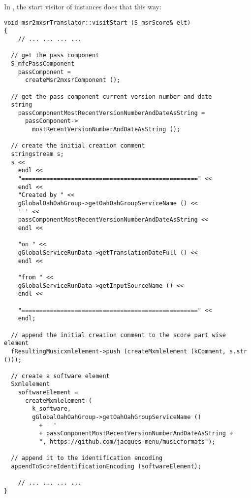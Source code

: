 In , the start visitor of  instances does that this way:
\begin{lstlisting}[language=CPlusPlus]
void msr2mxsrTranslator::visitStart (S_msrScore& elt)
{
 	// ... ... ... ...

  // get the pass component
  S_mfcPassComponent
    passComponent =
      createMsr2mxsrComponent ();

  // get the pass component current version number and date
  string
    passComponentMostRecentVersionNumberAndDateAsString =
      passComponent->
        mostRecentVersionNumberAndDateAsString ();

  // create the initial creation comment
  stringstream s;
  s <<
    endl <<
    "==================================================" <<
    endl <<
    "Created by " <<
    gGlobalOahOahGroup->getOahOahGroupServiceName () <<
    ' ' <<
    passComponentMostRecentVersionNumberAndDateAsString <<
    endl <<

    "on " <<
    gGlobalServiceRunData->getTranslationDateFull () <<
    endl <<

    "from " <<
    gGlobalServiceRunData->getInputSourceName () <<
    endl <<

    "==================================================" <<
    endl;

  // append the initial creation comment to the score part wise element
  fResultingMusicxmlelement->push (createMxmlelement (kComment, s.str ()));

  // create a software element
  Sxmlelement
    softwareElement =
      createMxmlelement (
        k_software,
        gGlobalOahOahGroup->getOahOahGroupServiceName ()
          + ' '
          + passComponentMostRecentVersionNumberAndDateAsString +
          ", https://github.com/jacques-menu/musicformats");

  // append it to the identification encoding
  appendToScoreIdentificationEncoding (softwareElement);

 	// ... ... ... ...
}
\end{lstlisting}

